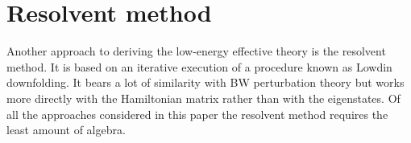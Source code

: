 \documentclass[floatfix,twocolumn,aps,prb,showpacs,superscriptaddress]{revtex4}
\begin{document}


\section{Resolvent method}


\label{resolvent}\setcounter{subsubsection}{0}


Another approach to deriving the low-energy effective theory is the
resolvent method. It is based on an iterative execution of a procedure known
as Lowdin downfolding.\cite{Lowdin} It bears a lot of similarity with BW
perturbation theory but works more directly with the Hamiltonian matrix
rather than with the eigenstates. Of all the approaches considered in this
paper the resolvent method requires the least amount of algebra.
\end{document}
